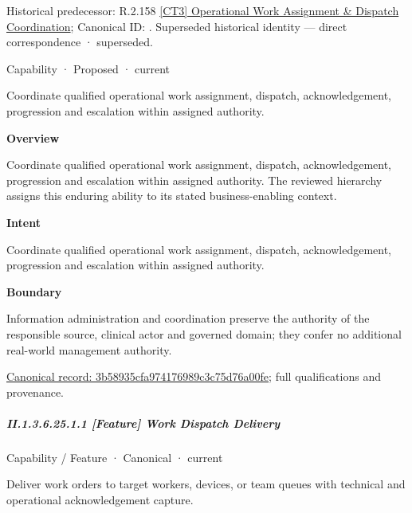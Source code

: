 {\small Historical predecessor: R.2.158 \hyperref[element:b42afda9e876463ba56fa8f73fe7a32a]{[CT3] Operational Work Assignment \& Dispatch Coordination}; Canonical ID: \texttt{}. Superseded historical identity — direct correspondence · superseded.}\par
\label{element:3b58935cfa974176989c3c75d76a00fe}
{\small Capability · Proposed · current}\par

Coordinate qualified operational work assignment, dispatch, acknowledgement, progression and escalation within assigned authority.



\textbf{Overview}



Coordinate qualified operational work assignment, dispatch, acknowledgement, progression and escalation within assigned authority. The reviewed hierarchy assigns this enduring ability to its stated business-enabling context.



\textbf{Intent}



Coordinate qualified operational work assignment, dispatch, acknowledgement, progression and escalation within assigned authority.



\textbf{Boundary}



Information administration and coordination preserve the authority of the responsible source, clinical actor and governed domain; they confer no additional real-world management authority.


{\footnotesize \href{../../../../continuum/strategy/capability/3b58935cfa974176989c3c75d76a00fe.md}{Canonical record: 3b58935cfa974176989c3c75d76a00fe}; full qualifications and provenance.}\par
\subparagraph*{II.1.3.6.25.1.1 [Feature] Work Dispatch Delivery}
\label{navigation:II.1.3.6.25.1.1}

\label{element:095826f788b64784af38af31bbe77105}
{\small Capability / Feature · Canonical · current}\par

Deliver work orders to target workers, devices, or team queues with technical and operational acknowledgement capture.



